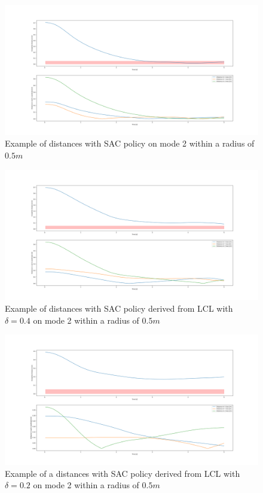 \begin{figure}[htp]
	\centering
	\includegraphics[width=\linewidth]{figures/flight4dist.png}
	\caption{Example of distances with SAC policy on mode 2 within a radius of $0.5m$}
	\label{fig:flight3}
\end{figure}

\begin{figure}[htp]
	\centering
	\includegraphics[width=\linewidth]{figures/flight5dist.png}
	\caption{Example of distances with SAC policy derived from LCL with $\delta = 0.4$ on mode 2 within a radius of $0.5m$}
	\label{fig:flight4}
\end{figure}

\begin{figure}[htp]
	\centering
	\includegraphics[width=\linewidth]{figures/flight6dist.png}
	\caption{Example of a distances with SAC policy derived from LCL with $\delta = 0.2$ on mode 2 within a radius of $0.5m$}
	\label{fig:flight5}
\end{figure}

